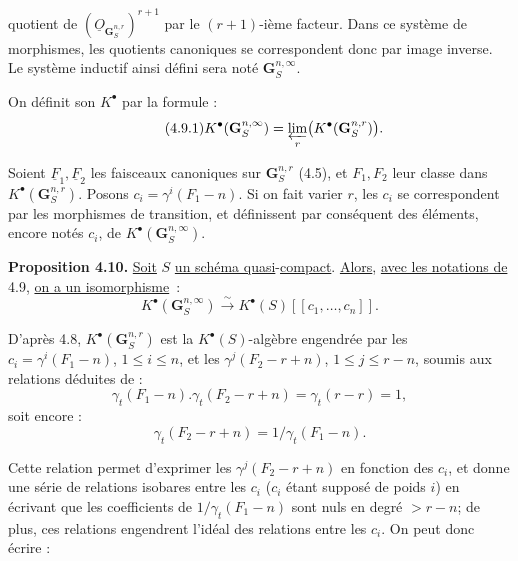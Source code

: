 
quotient de \((\underline{O}_{\mathbf G_S^{n,r}})^{r+1}\) par le \((r+1)\)-ième facteur. Dans ce système de morphismes, les quotients canoniques se correspondent donc par image inverse. Le système inductif ainsi défini sera noté \(\mathbf G_S^{n,\infty}\).

On définit son \(K^{\bullet}\) par la formule :
\begin{equation}\tag{4.9.1}
  K^{\bullet}(\mathbf G_S^{n,\infty})
  = \varprojlim_r \bigl(K^{\bullet}(\mathbf G_S^{n,r})\bigr) .
\end{equation}

Soient \(\underline{F}_1,\underline{F}_2\) les faisceaux canoniques sur \(\mathbf G_S^{n,r}\) (4.5), et \(F_1,F_2\) leur classe dans \(K^{\bullet}(\mathbf G_S^{n,r})\). Posons \(c_i=\gamma^i(F_1-n)\). Si on fait varier \(r\), les \(c_i\) se correspondent par les morphismes de transition, et définissent par conséquent des éléments, encore notés \(c_i\), de \(K^{\bullet}(\mathbf G_S^{n,\infty})\).

\textbf{Proposition 4.10.} \uline{Soit} \(S\) \uline{un schéma quasi}-\uline{compact}. \uline{Alors}, \uline{avec les notations de} 4.9, \uline{on a un isomorphisme}~:
\[
  K^{\bullet}(\mathbf G_S^{n,\infty})\xrightarrow{\sim} K^{\bullet}(S)[[c_1,\ldots,c_n]] .
\]

D'après 4.8, \(K^{\bullet}(\mathbf G_S^{n,r})\) est la \(K^{\bullet}(S)\)-algèbre engendrée par les \(c_i=\gamma^i(F_1-n)\), \(1\le i\le n\), et les \(\gamma^j(F_2-r+n)\), \(1\le j\le r-n\), soumis aux relations déduites de :
\[
  \gamma_t(F_1-n).\gamma_t(F_2-r+n)
  = \gamma_t(r-r)=1,
\]
soit encore :
\[
  \gamma_t(F_2-r+n)=1/\gamma_t(F_1-n).
\]

Cette relation permet d'exprimer les \(\gamma^j(F_2-r+n)\) en fonction des \(c_i\), et donne une série de relations isobares entre les \(c_i\) (\(c_i\) étant supposé de poids \(i\)) en écrivant que les coefficients de \(1/\gamma_t(F_1-n)\) sont nuls en degré \(>r-n\); de plus, ces relations engendrent l'idéal des relations entre les \(c_i\). On peut donc écrire :
